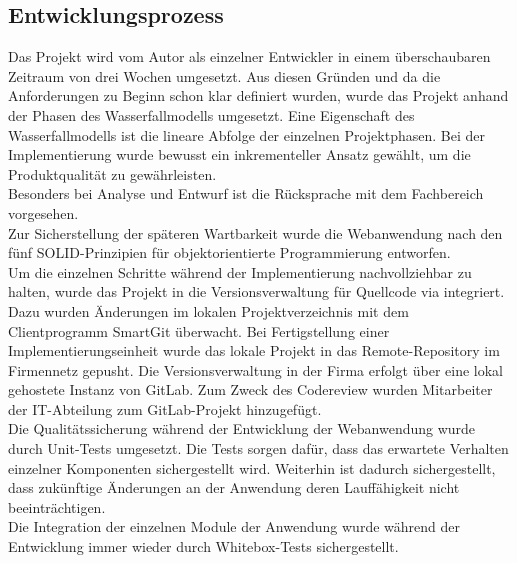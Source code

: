 \subsection{Entwicklungsprozess}
\label{sec:Entwicklungsprozess}
Das Projekt wird vom Autor als einzelner Entwickler in einem überschaubaren Zeitraum 
von drei Wochen umgesetzt. Aus diesen Gründen und da die Anforderungen zu Beginn schon
klar definiert wurden, wurde das Projekt anhand der Phasen des Wasserfallmodells umgesetzt. 
Eine Eigenschaft des Wasserfallmodells ist die lineare Abfolge der einzelnen Projektphasen.
Bei der Implementierung wurde bewusst ein inkrementeller Ansatz gewählt, um die Produktqualität
zu gewährleisten.\\
Besonders bei Analyse und Entwurf ist die Rücksprache mit dem Fachbereich
vorgesehen.\\
Zur Sicherstellung der späteren Wartbarkeit wurde die Webanwendung nach den fünf SOLID-Prinzipien
für objektorientierte Programmierung entworfen.\\ 
Um die einzelnen Schritte während der Implementierung nachvollziehbar zu halten,
wurde das Projekt in die Versionsverwaltung für Quellcode via  integriert.
Dazu wurden Änderungen im lokalen Projektverzeichnis mit dem Clientprogramm SmartGit überwacht.
Bei Fertigstellung einer Implementierungseinheit wurde das lokale Projekt in das 
Remote-Repository im Firmennetz gepusht. Die Versionsverwaltung in der Firma erfolgt über eine lokal gehostete Instanz
von GitLab. Zum Zweck des Codereview wurden Mitarbeiter der IT-Abteilung zum GitLab-Projekt hinzugefügt.\\
Die Qualitätssicherung während der Entwicklung der Webanwendung wurde durch Unit-Tests umgesetzt. Die Tests 
sorgen dafür, dass das erwartete Verhalten einzelner Komponenten sichergestellt wird. Weiterhin ist dadurch 
sichergestellt, dass zukünftige Änderungen an der Anwendung deren Lauffähigkeit nicht beeinträchtigen.\\
Die Integration der einzelnen Module der Anwendung wurde während der Entwicklung immer wieder durch Whitebox-Tests
sichergestellt.